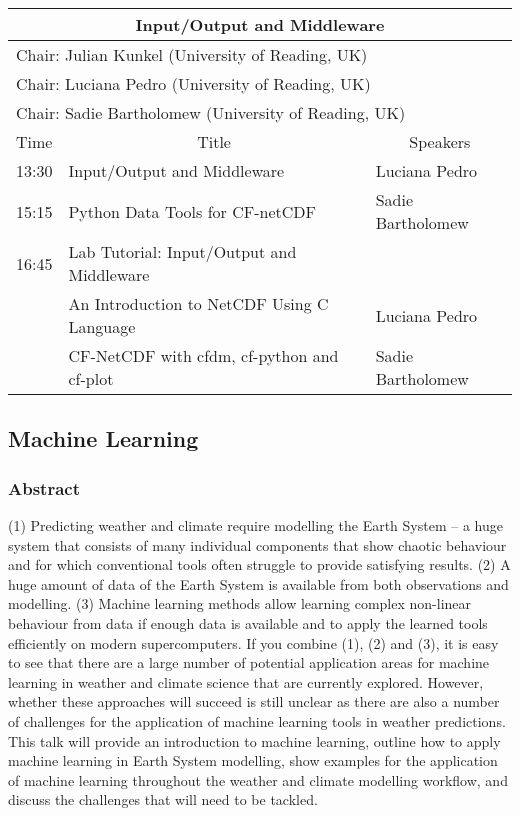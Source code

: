 \begin{table}[H]
\begin{center}
\begin{tabular}{|l|l|l|}
\hline
\multicolumn{3}{|c|}{\textbf{Input/Output and Middleware}} \\ \hline
\multicolumn{3}{|l|}{Chair: Julian Kunkel (University of Reading, UK)} \\
\multicolumn{3}{|l|}{Chair: Luciana Pedro (University of Reading, UK)} \\ \hline \hline
\multicolumn{3}{|l|}{Chair: Sadie Bartholomew (University of Reading, UK)} \\ \hline \hline
Time & \multicolumn{1}{c|}{Title} & \multicolumn{1}{c|}{Speakers} \\ \hline \hline
13:30 & Input/Output and Middleware & Luciana Pedro \\ \hline
15:15 & Python Data Tools for CF-netCDF & Sadie Bartholomew \\ \hline
16:45 & Lab Tutorial: Input/Output and Middleware & \\ \hline
      & An Introduction to NetCDF Using C Language & Luciana Pedro \\ \hline
      & CF-NetCDF with cfdm, cf-python and cf-plot & Sadie Bartholomew \\ \hline
\end{tabular}
\end{center}
\end{table}

\subsection{Machine Learning}

\subsubsection{Abstract}

(1) Predicting weather and climate require modelling the Earth System -- a huge system that consists of many individual components that show chaotic behaviour and for which conventional tools often struggle to provide satisfying results. (2) A huge amount of data of the Earth System is available from both observations and modelling. (3) Machine learning methods allow learning complex non-linear behaviour from data if enough data is available and to apply the learned tools efficiently on modern supercomputers. If you combine (1), (2) and (3), it is easy to see that there are a large number of potential application areas for machine learning in weather and climate science that are currently explored. However, whether these approaches will succeed is still unclear as there are also a number of challenges for the application of machine learning tools in weather predictions. This talk will provide an introduction to machine learning, outline how to apply machine learning in Earth System modelling, show examples for the application of machine learning throughout the weather and climate modelling workflow, and discuss the challenges that will need to be tackled.

